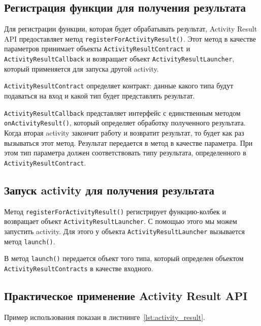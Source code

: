 \subsection{Регистрация функции для получения результата}
Для регистрации функции, которая будет обрабатывать результат, Activity
Result API предоставляет метод \texttt{registerForActivityResult()}.
Этот метод в качестве параметров принимает объекты
\texttt{ActivityResultContract} и \texttt{ActivityResultCallback}
и возвращает объект \texttt{ActivityResultLauncher},
который применяется для запуска другой activity.\par
\texttt{ActivityResultContract} определяет контракт: данные какого типа будут
подаваться на вход и какой тип будет представлять результат.\par
\texttt{ActivityResultCallback} представляет интерфейс с единственным методом
\texttt{onActivityResult()}, который определяет обработку полученного
результата. Когда вторая activity закончит работу и возвратит результат,
то будет как раз вызываться этот метод.
Результат передается в метод в качестве параметра.
При этом тип параметра должен соответствовать типу результата,
определенного в \texttt{ActivityResultContract}.

\subsection{Запуск activity для получения результата}
Метод \texttt{registerForActivityResult()} регистрирует функцию-колбек
и возвращает объект \texttt{ActivityResultLauncher}.
С помощью этого мы можем запустить activity.
Для этого у объекта \texttt{ActivityResultLauncher} вызывается метод
\texttt{launch()}.\par
В метод \texttt{launch()} передается объект того типа, который определен
объектом \texttt{ActivityResultContracts} в качестве входного.

\subsection{Практическое применение Activity Result API}
Пример использования показан в листнинге~\ref{lst:activity_result}.

